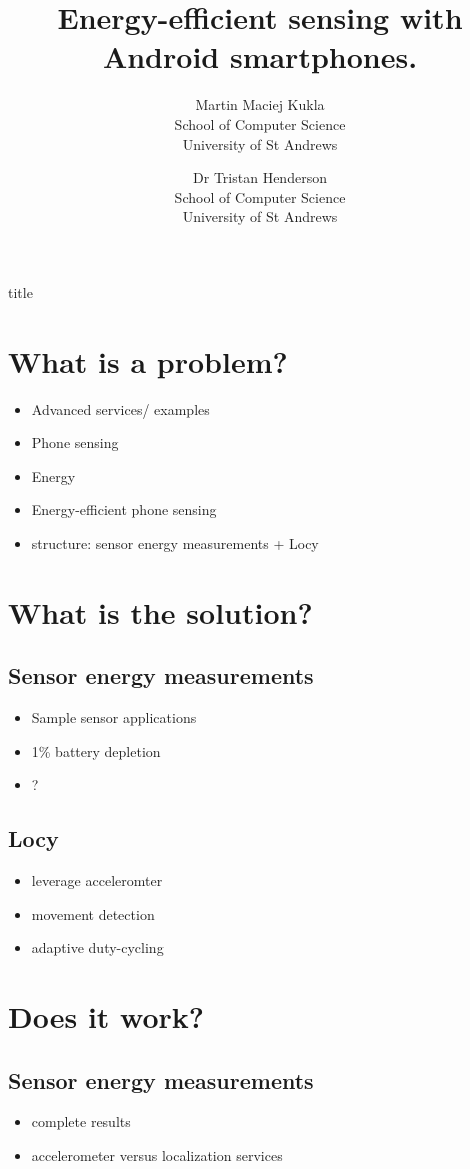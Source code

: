 \documentclass[a2,landscape]{a0poster}
\title{Energy-efficient sensing with Android smartphones.}
\author{Martin Maciej Kukla\\
School of Computer Science\\
University of St Andrews
\and
Dr Tristan Henderson\\
School of Computer Science\\
University of St Andrews}
\date{}
\begin{document}
\begin{staticcontents*}{title}
\maketitle
\end{staticcontents*}
\thispagestyle{empty}
\section*{What is a problem?}
\begin{itemize}
   \item Advanced services/ examples
   \item Phone sensing
   \item Energy
   \item Energy-efficient phone sensing
   \item structure: sensor energy measurements + Locy
  \end{itemize}

\mbox{}\framebreak
\section*{What is the solution?}
\subsection*{Sensor energy measurements}
\begin{itemize}
   \item Sample sensor applications
   \item 1\% battery depletion
   \item ?
  \end{itemize}
\subsection*{Locy}
\begin{itemize}
   \item leverage acceleromter
   \item movement detection
   \item adaptive duty-cycling
  \end{itemize}

\mbox{}\framebreak
\section*{Does it work?}
\subsection*{Sensor energy measurements}
\begin{itemize}
   \item complete results
   \item accelerometer versus localization services
  \end{itemize}
  
\end{document}
